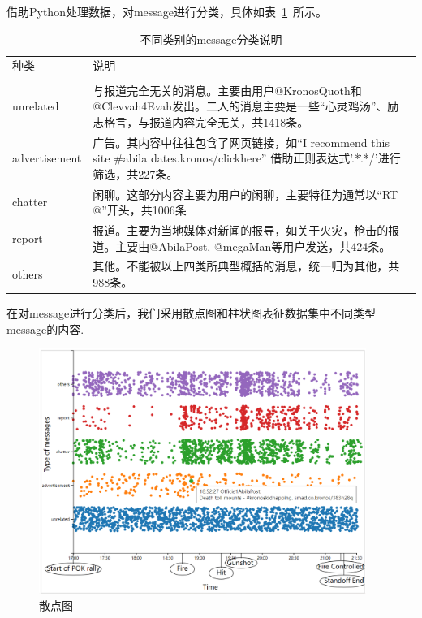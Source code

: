 \documentclass[a4paper]{article}
\begin{document}
借助Python处理数据，对message进行分类，具体如表~\ref{tab:table1}~所示。
\begin{table}[H]
  \caption{不同类别的message分类说明}\label{tab:table1}
  \vspace{0.5em}\centering
  \begin{tabular}{|p{2.2cm}<{\raggedright}|p{8.5cm}<{\raggedright}|}
    \toprule[1.5pt]
    种类          & 说明                                                                                                                                      \\                                                                                                                               \\
    \midrule[1pt]
    unrelated     & 与报道完全无关的消息。主要由用户@KronosQuoth和@Clevvah4Evah发出。二人的消息主要是一些“心灵鸡汤”、励志格言，与报道内容完全无关，共1418条。 \\ \hline
    advertisement & 广告。其内容中往往包含了网页链接，如“I recommend this site \#abila dates.kronos/clickhere” 借助正则表达式'.*\..*/'进行筛选，共227条。     \\ \hline
    chatter       & 闲聊。这部分内容主要为用户的闲聊，主要特征为通常以“RT @”开头，共1006条                                                                    \\ \hline
    report        & 报道。主要为当地媒体对新闻的报导，如关于火灾，枪击的报道。主要由@AbilaPost, @megaMan等用户发送，共424条。                                 \\ \hline
    others        & 其他。不能被以上四类所典型概括的消息，统一归为其他，共988条。                                                                             \\ \hline
    \bottomrule[1.5pt]
  \end{tabular}
  \vspace{\baselineskip}
\end{table}
在对message进行分类后，我们采用散点图和柱状图表征数据集中不同类型message的内容.
\begin{figure}[H]
  \centering
  \includegraphics[width=0.95\textwidth]{images/1-scatter-2.png}
  \caption{散点图}\label{fig:1-scatter}
  \vspace{\baselineskip}
\end{figure}
\end{document}
